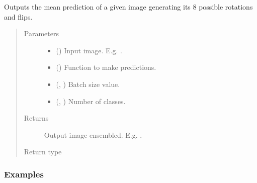 \documentclass[letterpaper,10pt,english]{sphinxmanual}
\begin{document}
\begin{fulllineitems}
\label{\detokenize{data/post_processing/post_processing:data.post_processing.post_processing.ensemble8_2d_predictions}}
Outputs the mean prediction of a given image generating its 8 possible rotations and flips.
\begin{quote}\begin{description}
\item[{Parameters}] \leavevmode\begin{itemize}
\item {} 
 () \textendash{} Input image. E.g. .

\item {} 
 () \textendash{} Function to make predictions.

\item {} 
 (, ) \textendash{} Batch size value.

\item {} 
 (, ) \textendash{} Number of classes.

\end{itemize}

\item[{Returns}] \leavevmode
{} \textendash{} Output image ensembled. E.g. .

\item[{Return type}] \leavevmode
{}

\end{description}\end{quote}
\subsubsection*{Examples}

\begin{sphinxVerbatim}[commandchars=\\\{\}]
     
   


\end{sphinxVerbatim}
\end{fulllineitems}
\end{document}

